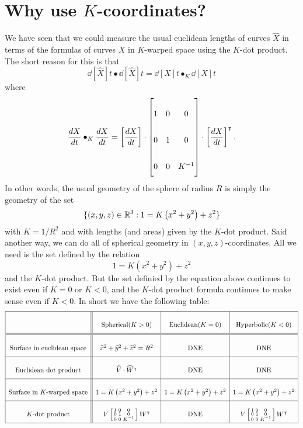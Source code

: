 \documentclass{ximera}
\begin{document}
\section{Why use $K$-coordinates?}

We have seen that we could measure the usual euclidean lengths of
curves $\hat{X}$ in terms of the formulas of curves $X$ in $K$-warped
space using the $K$-dot product. The short reason for this is that
\[
\dd[\hat{X}]{t}\bullet\dd[\hat{X}]{t}=\dd[X]{t}\bullet_{K}\dd[X]{t}
\]
where
\[
\dd[X]{t}\bullet_{K}\dd[X]{t}
=\left[\dd[X]{t}\right]\cdot\begin{bmatrix}
1 & 0 & 0\\
0 & 1 & 0\\
0 & 0 & K^{-1}%
\end{bmatrix}
\cdot\left[\dd[X]{t}\right]^\transpose.
\]
In other words, the usual geometry of the sphere of radius $R$ is
simply the geometry of the set
\[
\{(x,y,z)\in\mathbb R^3:1 = K\left(x^2 + y^2\right) +z^2\}
\]
with $K=1/R^{2}$ and with lengths (and areas) given by the $K$-dot
product. Said another way, we can do all of spherical geometry in
$(x,y,z)$-coordinates. All we need is the set defined by the relation
\[
1 = K\left(x^2 + y^2\right) +z^2
\]
and the $K$-dot product. But the set definied by the equation above
continues to exist even if $K=0$ or $K<0$, and the $K$-dot product
formula continues to make sense even if $K<0$. In short we have the
following table:
\[
  {\renewcommand{\arraystretch}{2.7}
  \begin{array}{|c||c|c|c|}\hline
& \text{Spherical} (K>0) & \text{Euclidean} (K=0) & \text{Hyperbolic} (K<0)\\\hline\hline
  \text{Surface in euclidean space} & \hat{x}^{2}+\hat{y}^{2}+\hat{z}^{2}=R^{2} & \text{DNE}  & \text{DNE} \\\hline
  \text{Euclidean dot product} & \hat{V}\cdot \hat{W}^\transpose & \text{DNE}  & \text{DNE}\\\hline
  \text{Surface in $K$-warped space} & {1=K\left(  x^{2}+y^{2}\right)  +z^{2}} & 1=K\left(  x^{2}+y^{2}\right)  +z^{2} & 1=K\left(  x^{2}+y^{2}\right)  +z^{2}\\\hline
  K\text{-dot product} & V\left[\begin{smallmatrix}1 & 0 & 0\\ 0 & 1 & 0\\ 0 & 0 & K^{-1}\end{smallmatrix}\right] W^\transpose &  \text{DNE} & V\left[\begin{smallmatrix}1 & 0 & 0\\ 0 & 1 & 0\\ 0 & 0 & K^{-1}\end{smallmatrix}\right]W^\transpose\\\hline
\end{array}}
\]
\end{document}
